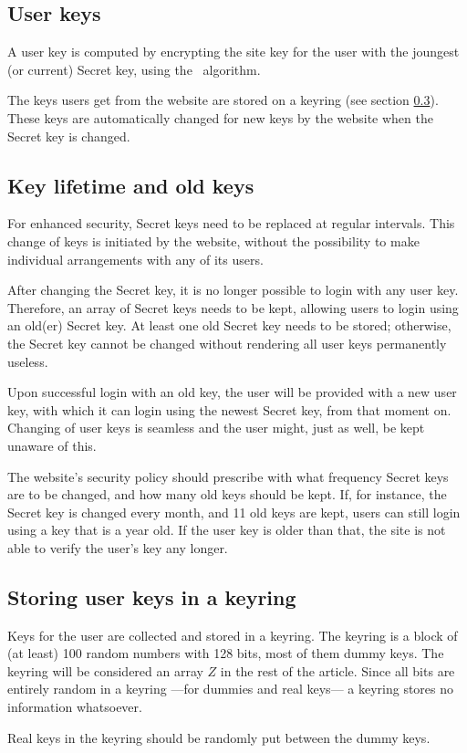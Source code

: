 \subsection{User keys}
\label{sec:userkeys}
A user key is computed by encrypting the site key for the user with the joungest (or current) Secret key,
using the \AES\ algorithm.
\par
The keys users get from the website are stored on a keyring (see section \ref{sec:keyring}).
These keys are automatically changed for new keys by the website when the Secret key is changed.

\subsection{Key lifetime and old keys}
For enhanced security, Secret keys need to be replaced at regular intervals.
This change of keys is initiated by the website,
without the possibility to make individual arrangements with any of its users.
\par
After changing the Secret key, it is no longer possible to login with any user key.
Therefore, an array of Secret keys needs to be kept, allowing users to login using an old(er) Secret key.
At least one old Secret key needs to be stored; otherwise, the Secret key cannot be changed without rendering all user keys permanently useless.
\par
Upon successful login with an old key, the user will be provided with a new user key,
with which it can login using the newest Secret key, from that moment on.
Changing of user keys is seamless and the user might, just as well, be kept unaware of this.
\par
The website's security policy should prescribe with what frequency Secret keys are to be changed, and how many old keys should be kept.
If, for instance, the Secret key is changed every month, and 11 old keys are kept, users can still login using a key that is a year old.
If the user key is older than that, the site is not able to verify the user's key any longer.

\subsection{Storing user keys in a keyring}
\label{sec:keyring}
Keys for the user are collected and stored in a keyring.
The keyring is a block of
(at least)
100 random numbers with 128 bits, most of them dummy keys.
The keyring will be considered an array $Z$ in the rest of the article.
Since all bits are entirely random in a keyring%
---for dummies and real keys---%
a keyring stores no information whatsoever.
\par
Real keys in the keyring should be randomly put between the dummy keys.

